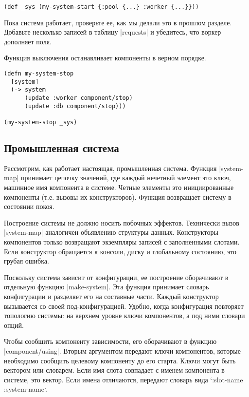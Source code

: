 \begin{verbatim}
(def _sys (my-system-start {:pool {...} :worker {...}}))
\end{verbatim}

Пока система работает, проверьте ее, как мы делали это в прошлом
разделе. Добавьте несколько записей в таблицу \spverb|requests| и убедитесь, что воркер
дополняет поля.

Функция выключения останавливает компоненты в верном порядке.

\begin{verbatim}
(defn my-system-stop
  [system]
  (-> system
      (update :worker component/stop)
      (update :db component/stop)))

(my-system-stop _sys)
\end{verbatim}

\subsection{Промышленная система}

Рассмотрим, как работает настоящая, промышленная система. Функция \spverb|system-map|
принимает цепочку значений, где каждый нечетный элемент это ключ, машинное имя
компонента в системе. Четные элементы это инициированные компоненты (т.е. вызовы
их конструкторов). Функция возвращает систему в состоянии покоя.

Построение системы не должно носить побочных эффектов. Технически вызов
\spverb|system-map| аналогичен объявлению структуры данных. Конструкторы компонентов
только возвращают экземпляры записей с заполненными слотами. Если конструктор
обращается к консоли, диску и глобальному состоянию, это грубая ошибка.

Поскольку система зависит от конфигурации, ее построение оборачивают в отдельную
функцию \spverb|make-system|. Эта функция принимает словарь конфигурации и разделяет
его на составные части. Каждый конструктор вызывается со своей
под-конфигурацией. Удобно, когда конфигурация повторяет топологию системы: на
верхнем уровне ключи компонентов, а под ними словари опций.

Чтобы сообщить компоненту зависимости, его оборачивают в функцию
\spverb|component/using|. Вторым аргументом передают ключи компонентов, которые
необходимо сообщить целевому компоненту до его старта. Ключи могут быть вектором
или словарем. Если имя слота совпадает с именем компонента в системе, это
вектор. Если имена отличаются, передают словарь вида `{:slot-name
:system-name}`.

